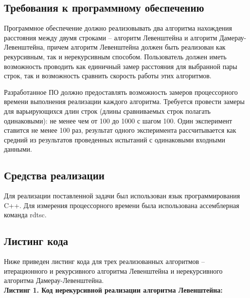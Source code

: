 \documentclass{article}
\begin{document}
\subsection{Требования к программному обеспечению}
\label{sec:technologicalt:requirements}

Программное обеспечение должно реализовывать два алгоритма нахождения расстояния между двумя строками – алгоритм Левенштейна и алгоритм Дамерау-Левенштейна, причем алгоритм Левенштейна должен быть реализован как рекурсивным, так и нерекурсивным способом. Пользователь должен иметь возможность проводить как единичный замер расстояния для выбранной пары строк, так и возможность сравнить скорость работы этих алгоритмов.

Разработанное ПО должно предоставлять возможность замеров процессорного времени выполнения реализации каждого алгоритма. Требуется провести замеры для варьирующихся длин строк (длины сравниваемых строк полагать одинаковыми): не менее чем от 100 до 1000 с шагом 100. Один эксперимент ставится не менее 100 раз, результат одного эксперимента рассчитывается как средний из результатов проведенных испытаний с одинаковыми входными данными.


\subsection{Средства реализации}
\label{sec:technologicalt:software}

Для реализации поставленной задачи был использован язык программирования C++.
Для измерения процессорного времени была использована ассемблерная команда rdtsc.

\subsection{Листинг кода}
\label{sec:technologicalt:code}
Ниже приведен листинг кода для трех реализованных алгоритмов – итерационного и рекурсивного алгоритма 
Левенштейна и нерекурсивного алгоритма Дамерау-Левенштейна.\\

\newpage
\small \textbf{Листинг 1. Код нерекурсивной реализации алгоритма Левенштейна:} \normalsize
\end{document}
